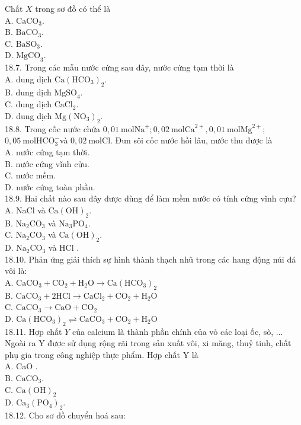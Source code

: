 \documentclass[10pt]{article}
\begin{document}
Chất $X$ trong sơ đồ có thể là\\
A. $\mathrm{CaCO}_{3}$.\\
B. $\mathrm{BaCO}_{3}$.\\
C. $\mathrm{BaSO}_{3}$.\\
D. $\mathrm{MgCO}_{3}$.\\
18.7. Trong các mẫu nước cứng sau đây, nước cứng tạm thời là\\
A. dung dịch $\mathrm{Ca}\left(\mathrm{HCO}_{3}\right)_{2}$.\\
B. dung dịch $\mathrm{MgSO}_{4}$.\\
C. dung dịch $\mathrm{CaCl}_{2}$.\\
D. dung dịch $\mathrm{Mg}\left(\mathrm{NO}_{3}\right)_{2}$.\\
18.8. Trong cốc nước chứa $0,01 \mathrm{~mol} \mathrm{Na}^{+} ; 0,02 \mathrm{~mol} \mathrm{Ca}^{2+}, 0,01 \mathrm{~mol} \mathrm{Mg}^{2+}$; $0,05 \mathrm{~mol} \mathrm{HCO}_{3}^{-}$và $0,02 \mathrm{~mol} \mathrm{Cl}$. Đun sôi cốc nước hồi lâu, nước thu được là\\
A. nước cứng tạm thời.\\
B. nước cứng vĩnh cửu.\\
C. nước mềm.\\
D. nước cứng toàn phần.\\
18.9. Hai chất nào sau đây được dùng để làm mềm nước có tính cứng vĩnh cựu?\\
A. NaCl và $\mathrm{Ca}(\mathrm{OH})_{2}$.\\
B. $\mathrm{Na}_{2} \mathrm{CO}_{3}$ và $\mathrm{Na}_{3} \mathrm{PO}_{4}$.\\
C. $\mathrm{Na}_{2} \mathrm{CO}_{3}$ và $\mathrm{Ca}(\mathrm{OH})_{2}$.\\
D. $\mathrm{Na}_{2} \mathrm{CO}_{3}$ và HCl .\\
18.10. Phản ứng giải thích sự hình thành thạch nhũ trong các hang động núi đá vôi là:\\
A. $\mathrm{CaCO}_{3}+\mathrm{CO}_{2}+\mathrm{H}_{2} \mathrm{O} \rightarrow \mathrm{Ca}\left(\mathrm{HCO}_{3}\right)_{2}$\\
B. $\mathrm{CaCO}_{3}+2 \mathrm{HCl} \rightarrow \mathrm{CaCl}_{2}+\mathrm{CO}_{2}+\mathrm{H}_{2} \mathrm{O}$\\
C. $\mathrm{CaCO}_{3} \rightarrow \mathrm{CaO}+\mathrm{CO}_{2}$\\
D. $\mathrm{Ca}\left(\mathrm{HCO}_{3}\right)_{2} \rightleftharpoons \mathrm{CaCO}_{3}+\mathrm{CO}_{2}+\mathrm{H}_{2} \mathrm{O}$\\
18.11. Hợp chất $Y$ của calcium là thành phần chính của vỏ các loại ốc, sò, ... Ngoài ra Y được sử dụng rộng rãi trong sản xuất vôi, xi măng, thuỷ tinh, chất phụ gia trong công nghiệp thực phẩm. Hợp chất Y là\\
A. CaO .\\
B. $\mathrm{CaCO}_{3}$.\\
C. $\mathrm{Ca}(\mathrm{OH})_{2}$\\
D. $\mathrm{Ca}_{3}\left(\mathrm{PO}_{4}\right)_{2}$.\\
18.12. Cho sơ đồ chuyển hoá sau:
\end{document}
